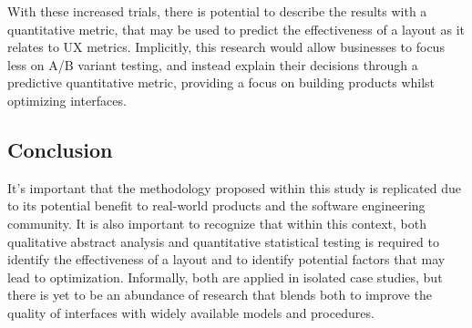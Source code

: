 \documentclass[conference]{IEEEtran}
\begin{document}
With these increased trials, there is potential to describe the results with a quantitative metric, that may be used to predict the effectiveness of a layout as it relates to UX metrics. Implicitly, this research would allow businesses to focus less on A/B variant testing, and instead explain their decisions through a predictive quantitative metric, providing a focus on building products whilst optimizing interfaces.

\subsection{Conclusion}
It's important that the methodology proposed within this study is replicated due to its potential benefit to real-world products and the software engineering community. It is also important to recognize that within this context, both qualitative abstract analysis and quantitative statistical testing is required to identify the effectiveness of a layout and to identify potential factors that may lead to optimization. Informally, both are applied in isolated case studies, but there is yet to be an abundance of research that blends both to improve the quality of interfaces with widely available models and procedures.



\end{document}
